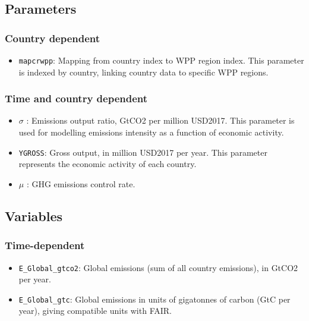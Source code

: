 \documentclass[
]{article}
\providecommand{\tightlist}{%
  \setlength{\itemsep}{0pt}\setlength{\parskip}{0pt}}
\begin{document}
\subsection{Parameters}\label{parameters-2}

\subsubsection{Country dependent}\label{country-dependent}

\begin{itemize}
\tightlist
\item
  \texttt{mapcrwpp}: Mapping from country index to WPP region index.
  This parameter is indexed by country, linking country data to specific WPP regions.
\end{itemize}

\subsubsection{Time and country
dependent}\label{time-and-country-dependent-4}

\begin{itemize}
\item
  \(\sigma\) : Emissions output ratio, GtCO2 per million USD2017. This
  parameter is used for modelling emissions intensity as a function of
  economic activity.
\item
  \texttt{YGROSS}: Gross output, in million USD2017 per year. This
  parameter represents the economic activity of each country.
\item
  \(\mu\) : GHG emissions control rate.
\end{itemize}

\subsection{Variables}\label{variables-2}

\subsubsection{Time-dependent}\label{time-dependent-3}

\begin{itemize}
\item
  \texttt{E\_Global\_gtco2}: Global emissions (sum of all country
  emissions), in GtCO2 per year.
\item
  \texttt{E\_Global\_gtc}: Global emissions in units of gigatonnes of
  carbon (GtC per year), giving compatible units with FAIR.
\end{itemize}
\end{document}
